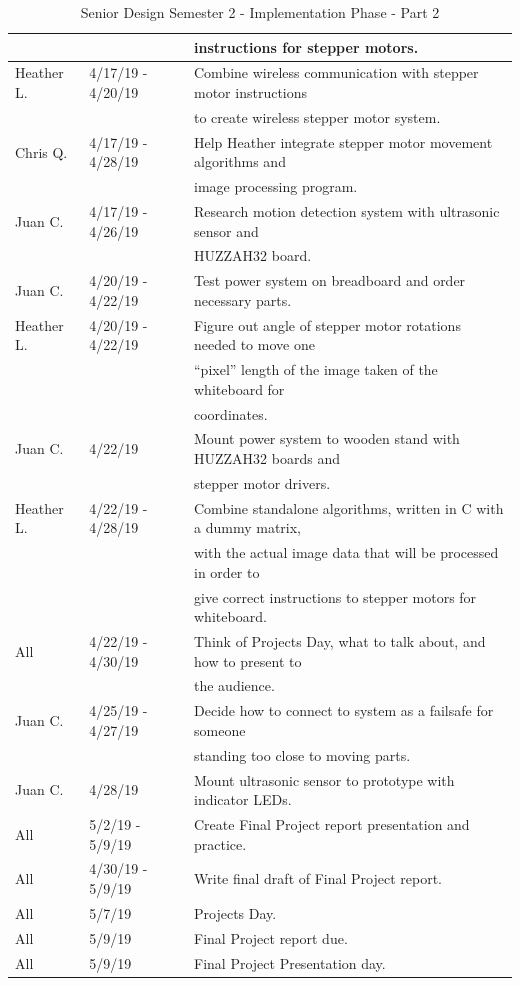 \begin{table} [H]
\begin{tabular}{|l|l|l|}
					&					& instructions for stepper motors. \\
		\hline
		Heather L. & 4/17/19 - 4/20/19 	& Combine wireless communication with stepper motor instructions \\
					&					& to create wireless stepper motor system. \\
		\hline
		Chris Q. & 4/17/19 - 4/28/19 	& Help Heather integrate stepper motor movement algorithms and \\
					&					& image processing program. \\
		\hline
		Juan C. & 4/17/19 - 4/26/19 	& Research motion detection system with ultrasonic sensor and \\
					&					& HUZZAH32 board. \\
		\hline
		Juan C. & 4/20/19 - 4/22/19 	& Test power system on breadboard and order necessary parts. \\
		\hline
		Heather L. & 4/20/19 - 4/22/19 	& Figure out angle of stepper motor rotations needed to move one \\
					&					& ``pixel'' length of the image taken of the whiteboard for \\
					&					& coordinates. \\
				\hline
		Juan C. & 4/22/19 				& Mount power system to wooden stand with HUZZAH32 boards and \\
					&					& stepper motor drivers. \\
		\hline
		Heather L. & 4/22/19 - 4/28/19 	& Combine standalone algorithms, written in C with a dummy matrix, \\
				&						& with the actual image data that will be processed in order to \\
				&						& give correct instructions to stepper motors for whiteboard. \\
		\hline
		All & 4/22/19 - 4/30/19 		& Think of Projects Day, what to talk about, and how to present to \\
				&						& the audience. \\
		\hline
		Juan C. & 4/25/19 - 4/27/19 	& Decide how to connect to system as a failsafe for someone \\
					&					& standing too close to moving parts. \\
		\hline
		Juan C. & 4/28/19 				& Mount ultrasonic sensor to prototype with indicator LEDs. \\
		\hline
		All & 5/2/19 - 5/9/19 			& Create Final Project report presentation and practice. \\
		\hline
		All & 4/30/19 - 5/9/19 			& Write final draft of Final Project report. \\
		\hline
		All & 5/7/19 					& Projects Day. \\
		\hline
		All & 5/9/19 					& Final Project report due. \\
		\hline
		All & 5/9/19 					& Final Project Presentation day. \\
		\hline
	\end{tabular} 
	\caption{Senior Design Semester 2 - Implementation Phase - Part 2}
	\label{table:5}
\end{table}

